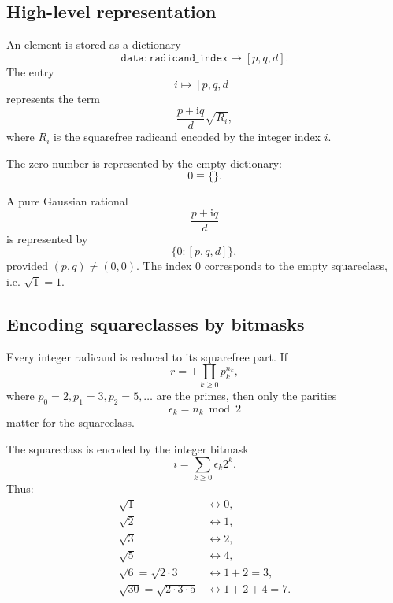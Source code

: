 \documentclass[11pt]{article}
\newcommand{\ii}{\mathrm{i}}
\begin{document}
\subsection{High-level representation}

An element is stored as a dictionary
\begin{equation}
  \texttt{data}: \texttt{radicand\_index} \longmapsto [p,q,d].
\end{equation}
The entry
\[
  i \mapsto [p,q,d]
\]
represents the term
\begin{equation}
  \frac{p+\ii q}{d}\sqrt{R_i},
\end{equation}
where \(R_i\) is the squarefree radicand encoded by the integer index \(i\).

The zero number is represented by the empty dictionary:
\begin{equation}
  0 \equiv \{\}.
\end{equation}

A pure Gaussian rational
\[
  \frac{p+\ii q}{d}
\]
is represented by
\begin{equation}
  \{0:[p,q,d]\},
\end{equation}
provided \((p,q)\neq (0,0)\). The index \(0\) corresponds to the empty squareclass, i.e. \(\sqrt{1}=1\).

\subsection{Encoding squareclasses by bitmasks}
\label{squareclass_encoding}

Every integer radicand is reduced to its squarefree part. If
\begin{equation}
  r = \pm \prod_{k\geq 0} p_k^{n_k},
\end{equation}
where \(p_0=2,p_1=3,p_2=5,\ldots\) are the primes, then only the parities
\begin{equation}
  \epsilon_k = n_k \bmod 2
\end{equation}
matter for the squareclass.

The squareclass is encoded by the integer bitmask
\begin{equation}
  i = \sum_{k\geq 0} \epsilon_k 2^k.
\end{equation}
Thus:
\begin{align*}
  \sqrt{1} &\leftrightarrow 0,\\
  \sqrt{2} &\leftrightarrow 1,\\
  \sqrt{3} &\leftrightarrow 2,\\
  \sqrt{5} &\leftrightarrow 4,\\
  \sqrt{6}=\sqrt{2\cdot 3} &\leftrightarrow 1+2=3,\\
  \sqrt{30}=\sqrt{2\cdot3\cdot5} &\leftrightarrow 1+2+4=7.
\end{align*}
\end{document}
